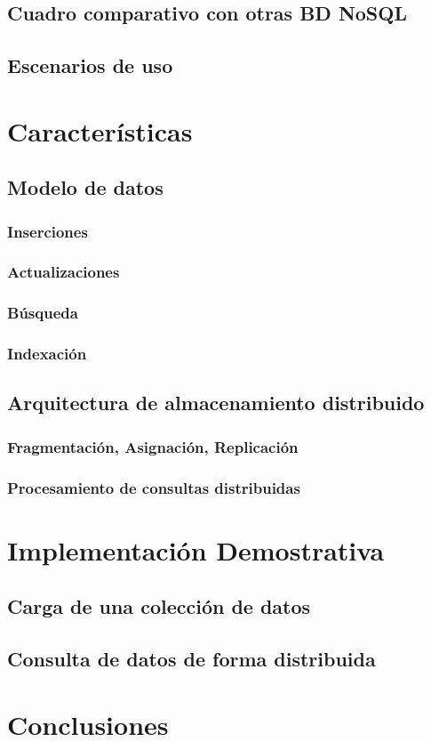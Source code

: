 \documentclass{article}
\begin{document}
        \subsection{Cuadro comparativo con otras BD NoSQL}
        \subsection{Escenarios de uso}
    \section{Características}
        \subsection{Modelo de datos}
            \subsubsection{Inserciones}
            \subsubsection{Actualizaciones}
            \subsubsection{Búsqueda}
            \subsubsection{Indexación} 
        \subsection{Arquitectura de almacenamiento distribuido}
            \subsubsection{Fragmentación, Asignación, Replicación}
            \subsubsection{Procesamiento de consultas distribuidas}
    \section{Implementación Demostrativa}
        \subsection{Carga de una colección de datos}
        \subsection{Consulta de datos de forma distribuida}
    \section{Conclusiones}

    \newpage

    
    
\end{document}
